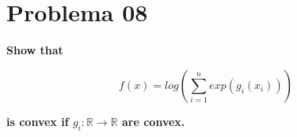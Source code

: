 \section*{Problema 08}

\textbf{Show that}

\begin{equation*}
    f(x) = log\left ( \sum_{i=1}^n exp(g_i(x_i)) \right )
\end{equation*}

\textbf{is convex if $g_i: \mathbb{R} \rightarrow \mathbb{R}$ are convex.}